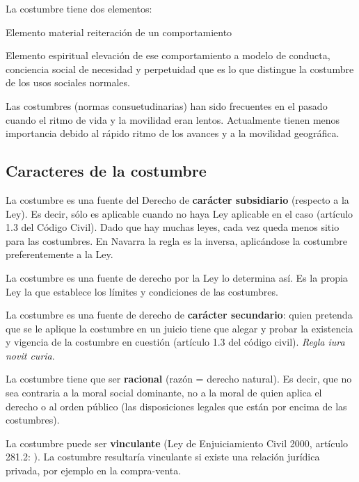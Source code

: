 \documentclass[a4paper,12pt]{report}
\begin{document}
La costumbre tiene dos elementos:
\begin{description}
\item{Elemento material} reiteración de un comportamiento
\item{Elemento espiritual} elevación de ese comportamiento a modelo de conducta, conciencia social de necesidad y perpetuidad que es lo que distingue la costumbre de los usos sociales normales.
\end{description}

Las costumbres (normas consuetudinarias) han sido frecuentes en el pasado cuando el ritmo de vida y la movilidad eran lentos. Actualmente tienen menos importancia debido al rápido ritmo de los avances y a la movilidad geográfica.

\subsection{Caracteres de la costumbre}

La costumbre es una fuente del Derecho de \textbf{carácter subsidiario} (respecto a la Ley). Es decir, sólo es aplicable cuando no haya Ley aplicable en el caso (artículo 1.3 del Código Civil). Dado que hay muchas leyes, cada vez queda menos sitio para las costumbres. En Navarra la regla es la inversa, aplicándose la costumbre preferentemente a la Ley.

La costumbre es una fuente de derecho por la Ley lo determina así. Es la propia Ley la que establece los límites y condiciones de las costumbres.

La costumbre es una fuente de derecho de \textbf{carácter secundario}: quien pretenda que se le aplique la costumbre en un juicio tiene que alegar y probar la existencia y vigencia de la costumbre en cuestión (artículo 1.3 del código civil). \textit{Regla iura novit curia}.

La costumbre tiene que ser \textbf{racional} (razón = derecho natural). Es decir, que no sea contraria a la moral social dominante, no a la moral de quien aplica el derecho o al orden público (las disposiciones legales que están por encima de las costumbres).

La costumbre puede ser \textbf{vinculante} (Ley de Enjuiciamiento Civil 2000, artículo 281.2: ). La costumbre resultaría vinculante si existe una relación jurídica privada, por ejemplo en la compra-venta.
\end{document}
